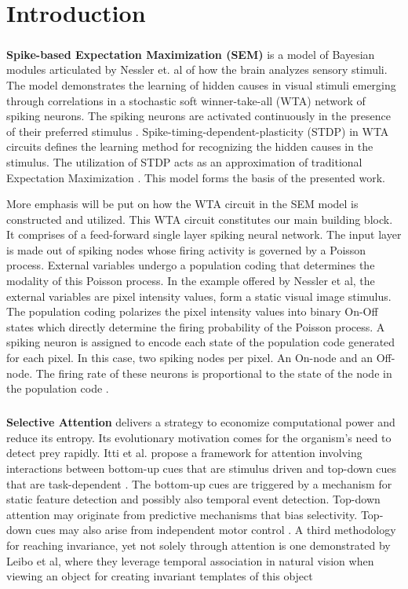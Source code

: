 \documentclass{report}
\begin{document}
\chapter{Introduction}

\paragraph{}\textbf{Spike-based Expectation Maximization (SEM)} is a model of Bayesian modules articulated by Nessler et. al of how the brain analyzes sensory stimuli. The model demonstrates the learning of hidden causes in visual stimuli emerging through correlations in a stochastic soft winner-take-all (WTA) network of spiking neurons. The spiking neurons are activated continuously in the presence of their preferred stimulus \cite{Nessler2010}. Spike-timing-dependent-plasticity (STDP) in WTA circuits defines the learning method for recognizing the hidden causes in the stimulus. The utilization of STDP acts as an approximation of traditional Expectation Maximization \cite{Nessler2013}. This model forms the basis of the presented work.

More emphasis will be put on how the WTA circuit in the SEM model is constructed and utilized. This WTA circuit constitutes our main building block. It comprises of a feed-forward single layer spiking neural network. The input layer is made out of spiking nodes whose firing activity is governed  by a Poisson process. External variables undergo a population coding that determines the modality of this Poisson process. In the example offered by Nessler et al, the external variables are pixel intensity values, form a static visual image stimulus. The population coding polarizes the pixel intensity values into binary On-Off states which directly determine the firing probability of the Poisson process. A spiking neuron is assigned to encode each state of the population code generated for each pixel. In this case, two spiking nodes per pixel. An On-node and an Off-node. The firing rate of these neurons is proportional to the state of the node in the population code \cite{Nessler2010}.

\paragraph{}\textbf{Selective Attention} delivers a strategy to economize computational power and reduce its entropy. Its evolutionary motivation comes for the organism's need to detect prey rapidly. Itti et al. propose a framework for attention involving interactions between bottom-up cues that are stimulus driven and top-down cues that are task-dependent \cite{Itti2001}. The bottom-up cues are triggered by a mechanism for static feature detection and possibly also temporal event detection. Top-down attention may originate from predictive mechanisms that bias selectivity. Top-down cues may also arise from independent motor control \cite{Olshausen1993}. A third methodology for reaching invariance, yet not solely through attention is one demonstrated by Leibo et al, where they leverage temporal association in natural vision when viewing an object for creating invariant templates of this object \cite{Leibo2010}
\end{document}

